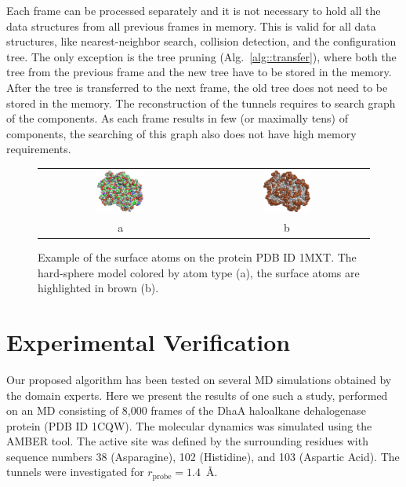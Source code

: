 \documentclass[usletter, 10pt, conference]{svjour3}      %
\def\probe{r_{\mathrm{probe}}}
\begin{document}
Each frame can be processed separately and it is not necessary to hold all the data structures from all previous frames in memory.
This is valid for all data structures, like nearest-neighbor search, collision detection, and the configuration tree.
The only exception is the tree pruning (Alg.~\ref{alg::transfer}), where both the tree from the previous frame and the new tree have to be stored in the memory.
After the tree is transferred to the next frame, the old tree does not need to be stored in the memory.
The reconstruction of the tunnels requires to search graph of the components. 
As each frame results in few (or maximally tens) of components, the searching of this graph also does not have high memory requirements.


\begin{figure}
\centering
\begin{tabular}{cc}
\includegraphics[width=0.3\textwidth]{fig/1mxta-alpha4} &
\includegraphics[width=0.3\textwidth]{fig/1mxta-alpha3} \\
a & b
\end{tabular}
\caption{\label{fig::surface}
Example of the surface atoms on the protein PDB ID 1MXT. The hard-sphere model colored by atom type (a), the surface atoms are highlighted in brown (b).
}
\end{figure}


\section{Experimental Verification}

Our proposed algorithm has been tested on several MD simulations obtained by the domain experts. 
Here we present the results of one such a study, performed on an MD consisting of 8,000 frames of the DhaA haloalkane dehalogenase protein (PDB ID 1CQW).
The molecular dynamics was simulated using the AMBER tool.
The active site was defined by the surrounding residues with sequence numbers 38 (Asparagine), 102 (Histidine), and 103 (Aspartic Acid).
The tunnels were investigated for $\probe=1.4$~\AA.
\end{document}
